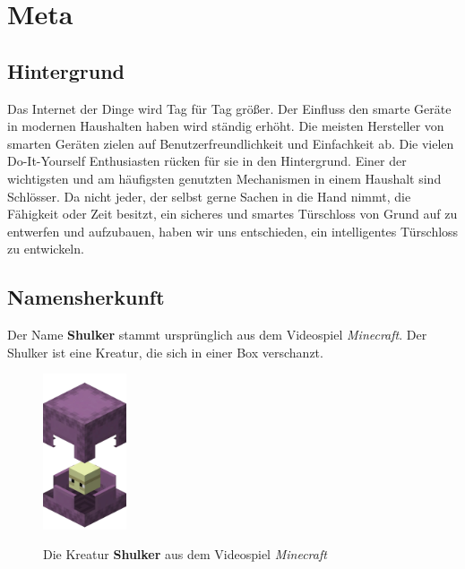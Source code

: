 \chapter{Meta}

\section{Hintergrund}

Das Internet der Dinge wird Tag für Tag größer. Der Einfluss den smarte Geräte in modernen Haushalten haben wird ständig erhöht. Die meisten Hersteller von smarten Geräten zielen auf Benutzerfreundlichkeit und Einfachkeit ab. Die vielen Do-It-Yourself Enthusiasten rücken für sie in den Hintergrund. Einer der wichtigsten und am häufigsten genutzten Mechanismen in einem Haushalt sind Schlösser.  Da nicht jeder, der selbst gerne Sachen in die Hand nimmt, die Fähigkeit oder Zeit besitzt, ein sicheres und smartes Türschloss von Grund auf zu entwerfen und aufzubauen, haben wir uns entschieden, ein intelligentes Türschloss zu entwickeln.

\section{Namensherkunft}

Der Name \textbf{Shulker} stammt ursprünglich aus dem Videospiel \textit{Minecraft}. Der Shulker ist eine Kreatur, die sich in einer Box verschanzt.

\begin{figure}[H]
    \begin{center}
        \includegraphics[width=0.22\textwidth]{images/Intro/Shulker.png}
        \caption{Die Kreatur \textbf{Shulker} aus dem Videospiel \textit{Minecraft}}
        \cite{mcwiki2015}
    \end{center}
\end{figure}

\newpage
